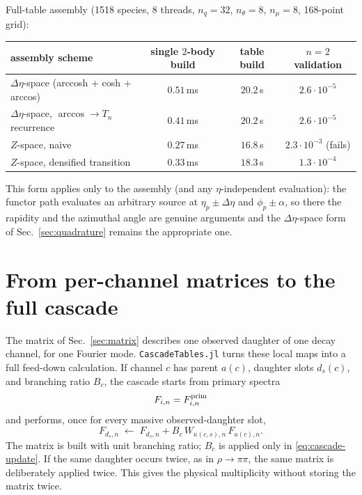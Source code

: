 \documentclass[11pt]{article}
\begin{document}
Full-table assembly (1518 species, 8 threads, $n_q{=}32$, $n_\theta{=}8$,
$n_\mu{=}8$, 168-point grid):
\begin{center}
\begin{tabular}{lccc}
\hline
assembly scheme & single $2$-body build & table build & $n{=}2$ validation\\
\hline
$\Delta\eta$-space (arccosh + cosh + arccos) & $0.51$\,ms & $20.2$\,s & $2.6\cdot10^{-5}$\\
$\Delta\eta$-space, $\arccos\to T_n$ recurrence & $0.41$\,ms & $20.2$\,s & $2.6\cdot10^{-5}$\\
$Z$-space, naive & $0.27$\,ms & $16.8$\,s & $2.3\cdot10^{-3}$ (fails)\\
$Z$-space, densified transition & $0.33$\,ms & $18.3$\,s & $1.3\cdot10^{-4}$\\
\hline
\end{tabular}
\end{center}

This form applies only to the assembly (and any $\eta$-independent
evaluation): the functor path evaluates an arbitrary source at
$\eta_p\pm\Delta\eta$ and $\phi_p\pm\alpha$, so there the rapidity and the
azimuthal angle are genuine arguments and the $\Delta\eta$-space form of
Sec.~\ref{sec:quadrature} remains the appropriate one.

\section{From per-channel matrices to the full cascade}
\label{sec:cascade}

The matrix of Sec.~\ref{sec:matrix} describes one observed daughter of one
decay channel, for one Fourier mode.  \texttt{CascadeTables.jl} turns these
local maps into a full feed-down calculation.  If channel $c$ has parent
$a(c)$, daughter slots $d_s(c)$, and branching ratio $B_c$, the cascade starts
from primary spectra
\begin{equation}
 F_{i,n}=F^{\rm prim}_{i,n}
\end{equation}
and performs, once for every massive observed-daughter slot,
\begin{equation}
 F_{d_s,n}\;\leftarrow\;
 F_{d_s,n}
 +B_c\,W_{\kappa(c,s),n}\,F_{a(c),n}.
 \label{eq:cascade-update}
\end{equation}
The matrix is built with unit branching ratio; $B_c$ is applied only in
\eqref{eq:cascade-update}.  If the same daughter occurs twice, as in
$\rho\to\pi\pi$, the same matrix is deliberately applied twice.  This gives
the physical multiplicity without storing the matrix twice.
\end{document}
